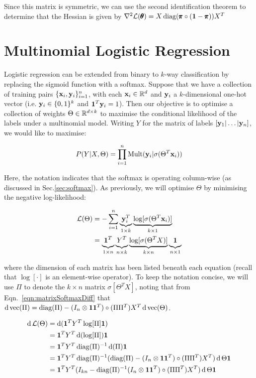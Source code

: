 Since this matrix is symmetric, we can use the second identification theorem \citep{magnus1988matrix} to determine that the Hessian is given by ${\nabla^2 \mathcal{L}(\pmb{\theta}) = X \operatorname{diag}(\pmb{\pi}\circ (\mathbf{1} - \pmb{\pi})) X^T}$

\section{Multinomial Logistic Regression}

Logistic regression can be extended from binary to $k$-way classification by replacing the sigmoid function with a softmax.  Suppose that we have a collection of training pairs $\{\mathbf{x}_i, \mathbf{y}_i\}_{i=1}^n$, with each $\mathbf{x}_i \in \mathbb{R}^d$ and $\mathbf{y}_i$ a $k$-dimensional one-hot vector (i.e. $\mathbf{y}_i \in \{0,1\}^k$ and $\mathbf{1}^T \mathbf{y}_i = 1$). Then our objective is to optimise a collection of weights $\Theta \in \mathbb{R}^{d \times k}$ to maximise the conditional likelihood of the labels under a multinomial model. Writing $Y$ for the matrix of labels $[\mathbf{y}_1 | \dots | \mathbf{y}_n]$, we would like to maximise:

\begin{align*}
  P(Y | X , \Theta) = \prod_{i=1}^n \text{Mult}(\mathbf{y}_i|\sigma(\Theta^T\mathbf{x}_i))
\end{align*}

Here, the notation indicates that the softmax is operating column-wise (as discussed in Sec.\ref{sec:softmax}).  As previously, we will optimise $\Theta$ by minimising the negative log-likelihood:

\begin{align*}
  \mathcal{L}(\Theta) &= -\sum_{i=1}^n \underbrace{\mathbf{y}_i^T}_{1 \times k} \underbrace{\log[\sigma(\Theta^T\mathbf{x}_i)]}_{k \times 1} \\
   &= \underbrace{\vphantom{[}\mathbf{1}^T}_{1 \times n} \underbrace{\vphantom{[}Y^T}_{n \times k} \underbrace{\log[\sigma(\Theta^T X)]}_{k \times n} \underbrace{\vphantom{[}\mathbf{1}}_{n \times 1} 
\end{align*}

where the dimension of each matrix has been listed beneath each equation (recall that $\log[\cdot]$ is an element-wise operator).  To keep the notation concise, we will use $\Pi$ to denote the $ k \times n$ matrix $\sigma[\Theta^T X]$, noting that from Eqn.~\ref{eqn:matrixSoftmaxDiff} that ${\operatorname{\text{d}} \operatorname{vec}(\Pi) = \operatorname{diag}(\Pi) - (I_n \otimes \mathbf{1} \mathbf{1}^T) \circ (\Pi\Pi^T)} X^T \operatorname{\text{d}} \operatorname{vec}(\Theta)$.


\begin{align}
\operatorname{\text{d}} \mathcal{L}(\Theta) &= \operatorname{\text{d}} (\mathbf{1}^T Y^T \log[\Pi] \mathbf{1}) \\
&= \mathbf{1}^T Y^T \operatorname{\text{d}}(\log[\Pi]) \mathbf{1}\\
&= \mathbf{1}^T Y^T \operatorname{diag}(\Pi)^{-1} \operatorname{\text{d}}(\Pi) \mathbf{1}\\
&= \mathbf{1}^T Y^T \operatorname{diag}(\Pi)^{-1} (\operatorname{diag}(\Pi) - (I_n \otimes \mathbf{1} \mathbf{1}^T) \circ (\Pi\Pi^T) X^T) \operatorname{\text{d}} \Theta  \mathbf{1}\\
&= \mathbf{1}^T Y^T (I_{kn} - \operatorname{diag}(\Pi)^{-1} (I_n \otimes \mathbf{1} \mathbf{1}^T) \circ (\Pi\Pi^T) X^T) \operatorname{\text{d}} \Theta  \mathbf{1}
\end{align}
